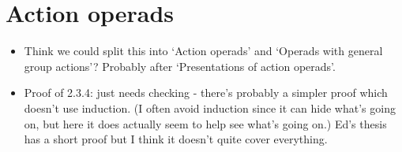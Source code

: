 \documentclass{amsart}
\begin{document}
\section{Action operads}
\begin{itemize}
	\item Think we could split this into `Action operads' and `Operads with general group actions'? Probably after `Presentations of action operads'.
\item Proof of 2.3.4: just needs checking - there's probably a simpler proof which doesn't use induction. (I often avoid induction since it can hide what's going on, but here it does actually seem to help see what's going on.) Ed's thesis has a short proof but I think it doesn't quite cover everything.

\end{itemize}
\end{document}
